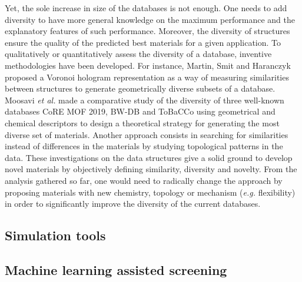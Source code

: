 \documentclass[main.tex]{subfiles}
\begin{document}
Yet, the sole increase in size of the databases is not enough. One needs to add diversity to have more general knowledge on the maximum performance and the explanatory features of such performance. Moreover, the diversity of structures ensure the quality of the predicted best materials for a given application.
To qualitatively or quantitatively assess the diversity of a database, inventive methodologies have been developed.
For instance, Martin, Smit and Haranczyk proposed a Voronoi hologram representation as a way of measuring similarities between structures to generate geometrically diverse subsets of a database.\cite{Martin_2011}
Moosavi \emph{et al.} made a comparative study of the diversity of three well-known databases CoRE MOF 2019,\cite{Chung_2019} BW-DB\cite{Boyd_2016} and ToBaCCo\cite{Gomez_Gualdron_2016, Colon_2017}  using geometrical and chemical descriptors to design a theoretical strategy for generating the most diverse set of materials.\cite{Moosavi_2020}
Another approach consists in searching for similarities instead of differences in the materials by studying topological patterns in the data.\cite{Lee_2017}
These investigations on the data structures give a solid ground to develop novel materials by objectively defining similarity, diversity and novelty. From the analysis gathered so far, one would need to radically change the approach by proposing materials with new chemistry, topology or mechanism (\emph{e.g.} flexibility) in order to significantly improve the diversity of the current databases.

\subsection{Simulation tools}

\subsection{Machine learning assisted screening}

\end{document}

